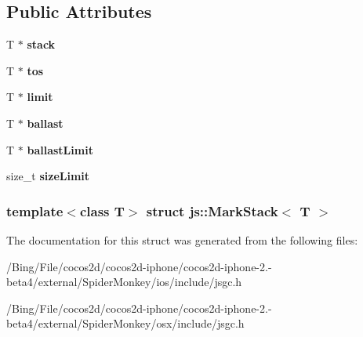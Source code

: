 \subsection*{Public Attributes}
\begin{DoxyCompactItemize}
\item 
\hypertarget{structjs_1_1_mark_stack_a85e228b47b4f650027560b830d9ce127}{T $\ast$ {\bfseries stack}}\label{structjs_1_1_mark_stack_a85e228b47b4f650027560b830d9ce127}

\item 
\hypertarget{structjs_1_1_mark_stack_a009a4367238bea87e322e8b2d81c5de4}{T $\ast$ {\bfseries tos}}\label{structjs_1_1_mark_stack_a009a4367238bea87e322e8b2d81c5de4}

\item 
\hypertarget{structjs_1_1_mark_stack_aa371f9181dc580b297bb89757927a91a}{T $\ast$ {\bfseries limit}}\label{structjs_1_1_mark_stack_aa371f9181dc580b297bb89757927a91a}

\item 
\hypertarget{structjs_1_1_mark_stack_a21b7e47d9e24794cf65bc33fa3f27794}{T $\ast$ {\bfseries ballast}}\label{structjs_1_1_mark_stack_a21b7e47d9e24794cf65bc33fa3f27794}

\item 
\hypertarget{structjs_1_1_mark_stack_a75f210576aa71df487ce312350b35c59}{T $\ast$ {\bfseries ballast\-Limit}}\label{structjs_1_1_mark_stack_a75f210576aa71df487ce312350b35c59}

\item 
\hypertarget{structjs_1_1_mark_stack_a43750056395430c57704d50376393fca}{size\-\_\-t {\bfseries size\-Limit}}\label{structjs_1_1_mark_stack_a43750056395430c57704d50376393fca}

\end{DoxyCompactItemize}
\subsubsection*{template$<$class T$>$ struct js\-::\-Mark\-Stack$<$ T $>$}



The documentation for this struct was generated from the following files\-:\begin{DoxyCompactItemize}
\item 
/\-Bing/\-File/cocos2d/cocos2d-\/iphone/cocos2d-\/iphone-\/2.-\/beta4/external/\-Spider\-Monkey/ios/include/jsgc.\-h\item 
/\-Bing/\-File/cocos2d/cocos2d-\/iphone/cocos2d-\/iphone-\/2.-\/beta4/external/\-Spider\-Monkey/osx/include/jsgc.\-h\end{DoxyCompactItemize}
